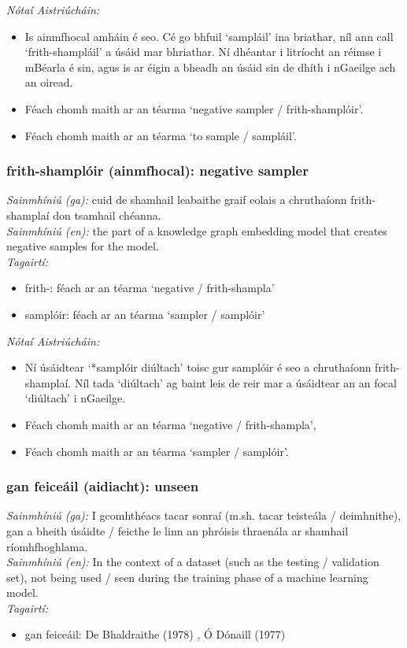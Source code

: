  \noindent \textit{Nótaí Aistriúcháin:}
\begin{itemize}
	\item Is ainmfhocal amháin é seo. Cé go bhfuil `sampláil' ina briathar, níl ann call `frith-shampláil' a úsáid mar bhriathar. Ní dhéantar i litríocht an réimse i mBéarla é sin, agus is ar éigin a bheadh an úsáid sin de dhíth i nGaeilge ach an oiread.
	\item Féach chomh maith ar an téarma `negative sampler / frith-shamplóir'.
	\item Féach chomh maith ar an téarma `to sample / sampláil'.
\end{itemize}


\subsubsection*{frith-shamplóir (ainmfhocal): negative sampler}
 \noindent \textit{Sainmhíniú (ga):} cuid de shamhail leabaithe graif eolais a chruthaíonn frith-shamplaí don tsamhail chéanna.
\\
 \noindent \textit{Sainmhíniú (en):} the part of a knowledge graph embedding model that creates negative samples for the model.
\\
 \noindent \textit{Tagairtí:}
\begin{itemize}
	\item frith-: féach ar an téarma `negative / frith-shampla'
	\item samplóir: féach ar an téarma `sampler / samplóir'
\end{itemize}

 \noindent \textit{Nótaí Aistriúcháin:}
\begin{itemize}
	\item Ní úsáidtear `*samplóir diúltach' toisc gur samplóir é seo a chruthaíonn frith-shamplaí. Níl tada `diúltach' ag baint leis de reir mar a úsáidtear an an focal `diúltach' i nGaeilge.
	\item Féach chomh maith ar an téarma `negative / frith-shampla',
	\item Féach chomh maith ar an téarma `sampler / samplóir'.
\end{itemize}


\subsubsection*{gan feiceáil (aidiacht): unseen}
 \noindent \textit{Sainmhíniú (ga):} I gcomhthéacs tacar sonraí (m.sh. tacar teisteála / deimhnithe), gan a bheith úsáidte / feicthe le linn an phróisis thraenála ar shamhail ríomhfhoghlama.
\\
 \noindent \textit{Sainmhíniú (en):} In the context of a dataset (such as the testing / validation set), not being used / seen during the training phase of a machine learning model.
\\
 \noindent \textit{Tagairtí:}
\begin{itemize}
	\item gan feiceáil: De Bhaldraithe (1978) \cite{de-bhaldraithe}, Ó Dónaill (1977) \cite{odonaill}
\end{itemize}

